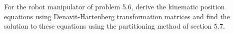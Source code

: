 \documentclass[onecolumn,10pt]{jhwhw}
\begin{document}



\problem{}
For the robot manipulator of problem 5.6, derive the kinematic position equations using Denavit-Hartenberg transformation matrices and find the solution to these equations using the partitioning method of section 5.7.
\end{document}
